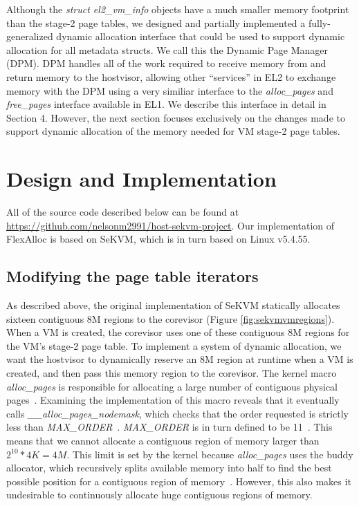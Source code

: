 Although the \textit{struct el2\_vm\_info} objects have a much smaller memory footprint than the stage-2 page tables,
we designed and partially implemented a fully-generalized dynamic allocation interface that
could be used to support dynamic allocation for all metadata structs. We call this the
Dynamic Page Manager (DPM). DPM handles all of the work required to receive memory from and return
memory to the hostvisor, allowing other ``services'' in EL2 to exchange memory with the DPM using
a very similiar interface to the \textit{alloc\_pages} and \textit{free\_pages} interface available in EL1. We describe
this interface in detail in Section 4. However, the next section focuses
exclusively on the changes made to support dynamic allocation of the memory
needed for VM stage-2 page tables.

\section{Design and Implementation}

All of the source code described below can be found at \url{https://github.com/nelsonm2991/host-sekvm-project}.
Our implementation of FlexAlloc is based on SeKVM, which is in turn based on Linux v5.4.55.

\subsection{Modifying the page table iterators}

As described above, the original implementation of SeKVM statically
allocates sixteen contiguous 8M regions to the corevisor (Figure \ref{fig:sekvmvmregions}). When a VM is created,
the corevisor uses one of these contiguous 8M regions for the VM's stage-2
page table. To implement a system of dynamic allocation, we want the hostvisor
to dynamically reserve an 8M region at runtime when a VM is created, and then
pass this memory region to the corevisor. The kernel macro \textit{alloc\_pages}
is responsible for allocating a large number of contiguous physical pages~\cite{kerneldocs}.
Examining the implementation of this macro reveals that it eventually
calls \textit{\_\_alloc\_pages\_nodemask}, which checks that the order requested
is strictly less than \textit{MAX\_ORDER}~\cite{page_alloc.c}. \textit{MAX\_ORDER}
is in turn defined to be 11~\cite{mmzone.h}. This means that we cannot allocate
a contiguous region of memory larger than $2^{10} * 4K = 4M$. This
limit is set by the kernel because \textit{alloc\_pages} uses the buddy allocator,
which recursively splits available memory into half to find the best possible position for
a contiguous region of memory~\cite{kerneldocs}. However, this also makes it
undesirable to continuously allocate huge contiguous regions of memory.

